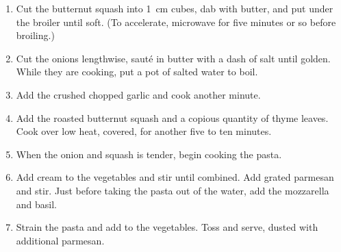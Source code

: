 \altdish{}

\begin{ingredients}
\end{ingredients}


\begin{recipe}
  \begin{enumerate}

  \item Cut the butternut squash into 1~cm cubes, dab with butter, and
    put under the broiler until soft.  (To accelerate, microwave for
    five minutes or so before broiling.)

  \item Cut the onions lengthwise, sauté in butter with a dash of salt
    until golden.  While they are cooking, put a pot of salted water
    to boil.

  \item Add the crushed chopped garlic and cook another minute.

  \item Add the roasted butternut squash and a copious quantity of
    thyme leaves.  Cook  over low heat, covered, for another five to
    ten minutes.

  \item When the onion and squash is tender, begin cooking the pasta.

  \item Add cream to the vegetables and stir until combined.  Add
    grated parmesan and stir.  Just before taking the pasta out of the
    water, add the mozzarella and basil.

  \item Strain the pasta and add to the vegetables.  Toss and serve,
    dusted with additional parmesan.

  \end{enumerate}
\end{recipe}

